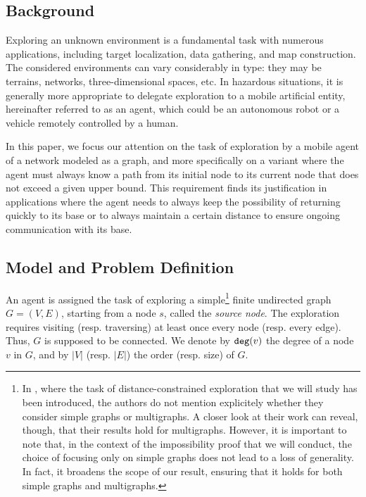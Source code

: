 \documentclass[11pt]{article}
\begin{document}
\subsection{Background}

Exploring an unknown environment is a fundamental task with numerous applications, including target localization, data gathering, and map construction. The considered environments can vary considerably in type: they may be terrains, networks, three-dimensional spaces, etc. In hazardous situations, it is generally more appropriate to delegate exploration to a mobile artificial entity, hereinafter referred to as an agent, which could be an autonomous robot or a vehicle remotely controlled by a human.

In this paper, we focus our attention on the task of exploration by a mobile agent of a network modeled as a graph, and more specifically on a variant where the agent must always know a path from its initial node to its current node that does not exceed a given upper bound. This requirement finds its justification in applications where the agent needs to always keep the possibility of returning quickly to its base or to always maintain a certain distance to ensure ongoing communication with its base.

\subsection{Model and Problem Definition}\label{sec:model}

An agent is assigned the task of exploring a simple\footnote{In \cite{DuncanKK06}, where the task of distance-constrained exploration that we will study has been introduced, the authors do not mention explicitely whether they consider simple graphs or multigraphs. A closer look at their work can reveal, though, that their results hold for multigraphs. However, it is important to note that, in the context of the impossibility proof that we will conduct, the choice of focusing only on simple graphs does not lead to a loss of generality. In fact, it broadens the scope of our result, ensuring that it holds for both simple graphs and multigraphs.} finite undirected graph $G=(V,E)$, starting from a node $s$, called the \emph{source node}. The exploration requires visiting (resp. traversing) at least once every node (resp. every
edge). Thus, $G$ is supposed to be connected. We denote by ${\tt deg}(v)$ the degree of a node $v$ in $G$, and by $|V|$ (resp. $|E|$) the order (resp. size) of $G$.
\end{document}
